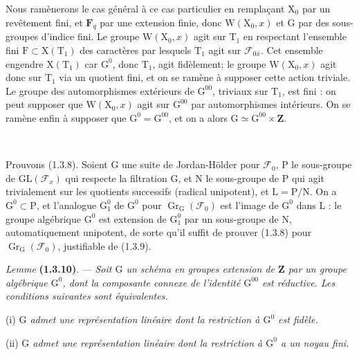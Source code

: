 \documentclass[11pt,leqno]{article}
\newcommand{\Page}[1]{\ifvmode\noindent\else\unskip\ \fi{\footnotesize\textcolor{gray}{[p.\,#1]}}\ \ignorespaces}
\begin{document}
Nous ramènerons le cas général à ce cas particulier en remplaçant \(\mathrm{X}_0\) par un revêtement fini, et \(\mathbf{F}_q\) par une extension finie, donc \(\mathrm{W}(\mathrm{X}_0,x)\) et \(\mathrm{G}\) par des sous-groupes d’indice fini. Le groupe \(\mathrm{W}(\mathrm{X}_0,x)\) agit sur \(\mathrm{T}_1\) en respectant l’ensemble fini \(\mathrm{F}\subset\mathrm{X}(\mathrm{T}_1)\) des caractères par lesquels \(\mathrm{T}_1\) agit sur \(\mathscr{F}_{0\bar{x}}\). Cet ensemble engendre \(\mathrm{X}(\mathrm{T}_1)\) car \(\mathrm{G}^0\), donc \(\mathrm{T}_1\), agit fidèlement; le groupe \(\mathrm{W}(\mathrm{X}_0,x)\) agit donc sur \(\mathrm{T}_1\) via un quotient fini, et on se ramène à supposer cette action triviale. Le groupe des automorphismes extérieurs de \(\mathrm{G}^{00}\), triviaux sur \(\mathrm{T}_1\), est fini : on peut supposer que \(\mathrm{W}(\mathrm{X}_0,x)\) agit sur \(\mathrm{G}^{00}\) par automorphismes intérieurs. On se ramène enfin à supposer que \(\mathrm{G}^0=\mathrm{G}^{00}\), et on a alors \(\mathrm{G}\simeq\mathrm{G}^{00}\times\mathbf{Z}\).

\Page{160}

Prouvons (1.3.8). Soient \(\mathrm{G}\) une suite de Jordan-Hölder pour \(\mathscr{F}_0\), \(\mathrm{P}\) le sous-groupe de \(\mathrm{GL}(\mathscr{F}_x)\) qui respecte la filtration \(\mathrm{G}\), et \(\mathrm{N}\) le sous-groupe de \(\mathrm{P}\) qui agit trivialement sur les quotients successifs (radical unipotent), et \(\mathrm{L}=\mathrm{P}/\mathrm{N}\). On a \(\mathrm{G}^0\subset\mathrm{P}\), et l’analogue \(\mathrm{G}_1^0\) de \(\mathrm{G}^0\) pour \(\operatorname{Gr}_{\mathrm{G}}(\mathscr{F}_0)\) est l’image de \(\mathrm{G}^0\) dans \(\mathrm{L}\) : le groupe algébrique \(\mathrm{G}^0\) est extension de \(\mathrm{G}_1^0\) par un sous-groupe de \(\mathrm{N}\), automatiquement unipotent, de sorte qu’il suffit de prouver (1.3.8) pour \(\operatorname{Gr}_{\mathrm{G}}(\mathscr{F}_0)\), justifiable de (1.3.9).

\textit{Lemme} \textbf{(1.3.10)}. — \textit{Soit \(\mathrm{G}\) un schéma en groupes extension de \(\mathbf{Z}\) par un groupe algébrique \(\mathrm{G}^0\), dont la composante connexe de l’identité \(\mathrm{G}^{00}\) est réductive. Les conditions suivantes sont équivalentes.}

(i) \textit{\(\mathrm{G}\) admet une représentation linéaire dont la restriction à \(\mathrm{G}^0\) est fidèle.}

(ii) \textit{\(\mathrm{G}\) admet une représentation linéaire dont la restriction à \(\mathrm{G}^0\) a un noyau fini.}
\end{document}
